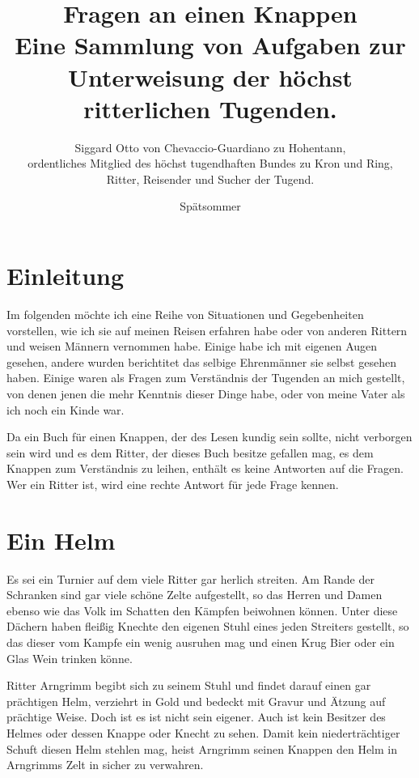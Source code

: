\documentclass[twocolumn, pdftex, 12pt]{book}
\begin{document}
\title{Fragen an einen Knappen \\ Eine Sammlung von Aufgaben zur Unterweisung
der höchst ritterlichen Tugenden.}

\author{Siggard Otto von Chevaccio-Guardiano zu Hohentann, \\ ordentliches
Mitglied des höchst tugendhaften Bundes zu Kron und Ring, \\ Ritter, Reisender
und Sucher der Tugend.}

\date{Spätsommer}

\maketitle

\chapter{Einleitung}

Im folgenden möchte ich eine Reihe von Situationen und Gegebenheiten vorstellen,
wie ich sie auf meinen Reisen erfahren habe oder von anderen Rittern und weisen
Männern vernommen habe. Einige habe ich mit eigenen Augen gesehen, andere wurden
berichtitet das selbige Ehrenmänner sie selbst gesehen haben. Einige waren als
Fragen zum Verständnis der Tugenden an mich gestellt, von denen jenen die mehr
Kenntnis dieser Dinge habe, oder von meine Vater als ich noch ein Kinde war.

Da ein Buch für einen Knappen, der des Lesen kundig sein sollte, nicht verborgen
sein wird und es dem Ritter, der dieses Buch besitze gefallen mag, es dem
Knappen zum Verständnis zu leihen, enthält es keine Antworten auf die Fragen.
Wer ein Ritter ist, wird eine rechte Antwort für jede Frage kennen.

\chapter{Ein Helm}

Es sei ein Turnier auf dem viele Ritter gar herlich streiten. Am Rande der
Schranken sind gar viele schöne Zelte aufgestellt, so das Herren und Damen
ebenso wie das Volk im Schatten den Kämpfen beiwohnen können. Unter diese
Dächern haben fleißig Knechte den eigenen Stuhl eines jeden Streiters gestellt,
so das dieser vom Kampfe ein wenig ausruhen mag und einen Krug Bier oder ein
Glas Wein trinken könne.

Ritter Arngrimm begibt sich zu seinem Stuhl und findet darauf einen gar
prächtigen Helm, verziehrt in Gold und bedeckt mit Gravur und Ätzung auf
prächtige Weise. Doch ist es ist nicht sein eigener. Auch
ist kein Besitzer des Helmes oder dessen Knappe oder Knecht zu sehen. Damit kein
niederträchtiger Schuft diesen Helm stehlen mag, heist Arngrimm seinen Knappen
den Helm in Arngrimms Zelt in sicher zu verwahren. 
\end{document}
